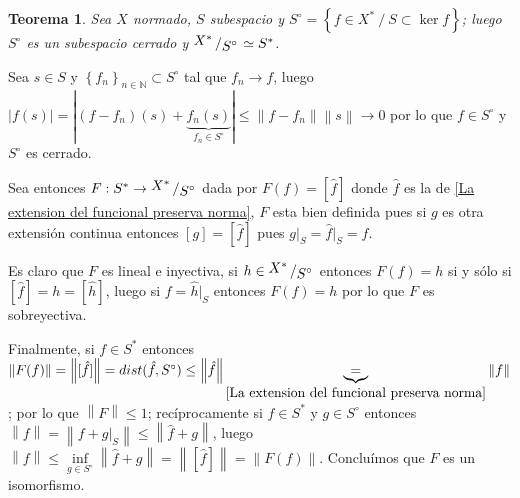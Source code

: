 \documentclass[11pt]{article}
\newcommand{\N}{{\mathbb{N}}}
\newcommand{\norm}[1]{\left\lVert#1\right\rVert}
\newcommand{\abs}[1]{\left\lvert#1\right\rvert}
\newcommand{\sett}[1]{\left\lbrace#1\right\rbrace}
\newcommand{\quotient}[2]{{\raisebox{.2em}{$#1$}\left/\raisebox{-.2em}{$#2$}\right.}}
\newtheorem{theorem}{Teorema}
\numberwithin{theorem}{subsection}
\newenvironment{proof}[1][Demostraci\'on]{\begin{trivlist}
		\item[\hskip \labelsep {\bfseries #1}]}{\end{trivlist}}
\newcommand{\qed}{\nobreak \ifvmode \relax \else
	\ifdim\lastskip<1.5em \hskip-\lastskip
	\hskip1.5em plus0em minus0.5em \fi \nobreak
	\vrule height0.75em width0.5em depth0.25em\fi}
\begin{document}
\begin{theorem}
	\label{El dual de un subespacio es el cociente del dual por el polar}
	Sea $X$ normado, $S$ subespacio y $S^{\circ} = \sett{f \in X^{\ast} \ / \ S \subset \ker f}$; luego $S^{\circ}$ es un subespacio cerrado y $\quotient{X^{\ast}}{S^{\circ}} \simeq S^{\ast}$.
\end{theorem}

\begin{proof}
	Sea $s \in S$ y $\sett{f_n}_{n \in \N} \subset S^{\circ}$ tal que $f_n \rightarrow f$, luego $\abs{f(s)} = \abs{(f-f_n)(s) + \underbrace{f_n(s)}_{f_n \in S^{\circ}}} \leq \norm{f-f_n}\norm{s} \rightarrow 0 $ por lo que $f \in S^{\circ}$ y $S^{\circ}$ es cerrado.
	
	Sea entonces $F : S^{\ast} \rightarrow \quotient{X^{\ast}}{S^{\circ}}$ dada por $F(f) = [\hat{f}]$ donde $\hat{f}$ es la de \ref{La extension del funcional preserva norma}, $F$ esta bien definida pues si $g$ es otra extensi\'on continua entonces $[g] = [\hat{f}]$ pues $g \vert_{S} = \hat{f} \vert_{S} = f$.
	
	Es claro que $F$ es lineal e inyectiva, si $h \in \quotient{X^{\ast}}{S^{\circ}}$ entonces $F(f) = h$ si y s\'olo si $[\hat{f}] = h = [\hat{h}]$, luego si $f = \hat{h} \vert_{S}$ entonces $F(f)=h$ por lo que $F$ es sobreyectiva.
	
	Finalmente, si $f \in S^{\ast}$ entonces $\norm{F(f)} = \norm{[\hat{f}]} = dist (\hat{f}, S^{\circ}) \leq \norm{\hat{f}} \underbrace{=}_{\ref{La extension del funcional preserva norma}} \norm{f}$; por lo que $\norm{F} \leq 1$; rec\'iprocamente si $f \in S^{\ast}$ y $g \in S^{\circ}$ entonces $\norm{f} = \norm{f + g \vert_S} \leq \norm{\hat{f} + g}$, luego $\norm{f} \leq \inf\limits_{g \in S^{\circ}}{\norm{\hat{f} + g}} = \norm{[\hat{f}]} = \norm{F(f)}$. Conclu\'imos que $F$ es un isomorfismo.\qed
	
\end{proof}
\end{document}
